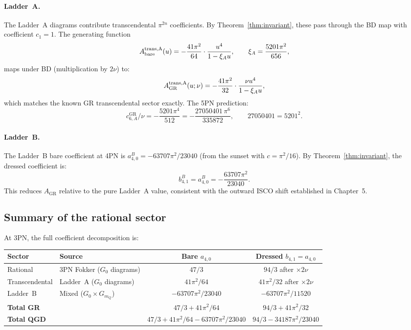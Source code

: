 \documentclass[11pt,a4paper]{article}
\theoremstyle{plain}
\theoremstyle{definition}
\theoremstyle{remark}
\newcommand{\mQ}{m_Q}
\newcommand{\GR}{\mathrm{GR}}
\newcommand{\bare}{\mathrm{bare}}
\begin{document}
\paragraph{Ladder~A.} The Ladder~A diagrams contribute transcendental
$\pi^{2n}$ coefficients.  By Theorem~\ref{thm:invariant}, these pass through
the BD map with coefficient $c_1 = 1$.  The generating function
\begin{equation}
  A_\bare^{\rm trans,A}(u) = -\frac{41\pi^2}{64}\cdot\frac{u^4}{1-\xi_A u},
  \qquad \xi_A = \frac{5201\pi^2}{656},
\end{equation}
maps under BD (multiplication by $2\nu$) to:
\begin{equation}
  A_\GR^{\rm trans,A}(u;\nu) = -\frac{41\pi^2}{32}\cdot\frac{\nu u^4}{1-\xi_A u},
  \label{eq:ladder_A_dressed}
\end{equation}
which matches the known GR transcendental sector exactly.  The 5PN prediction:
\begin{equation}
  c_{6,A}^\GR/\nu = -\frac{5201\pi^4}{512}
  = -\frac{27050401\,\pi^6}{335872},
  \qquad 27050401 = 5201^2.
\end{equation}

\paragraph{Ladder~B.} The Ladder~B bare coefficient at 4PN is
$a_{4,0}^B = -63707\pi^2/23040$ (from the sunset with $c=\pi^2/16$).  By
Theorem~\ref{thm:invariant}, the dressed coefficient is:
\begin{equation}
  b_{4,1}^B = a_{4,0}^B = -\frac{63707\pi^2}{23040}.
\end{equation}
This reduces $A_\GR$ relative to the pure Ladder~A value, consistent with the
outward ISCO shift established in Chapter~5.

\subsection{Summary of the rational sector}

At 3PN, the full coefficient decomposition is:

\begin{center}
\renewcommand{\arraystretch}{1.45}
\begin{tabular}{llcc}
\toprule
Sector & Source & Bare $a_{4,0}$ & Dressed $b_{4,1} = a_{4,0}$ \\
\midrule
Rational & 3PN Fokker ($G_0$ diagrams) & $47/3$ & $94/3$ after $\times 2\nu$ \\
Transcendental & Ladder~A ($G_0$ diagrams) & $41\pi^2/64$ & $41\pi^2/32$ after $\times 2\nu$ \\
Ladder~B & Mixed ($G_0 \times G_{\mQ}$) & $-63707\pi^2/23040$ & $-63707\pi^2/11520$ \\
\midrule
\textbf{Total GR} & & $47/3 + 41\pi^2/64$ & $94/3 + 41\pi^2/32$ \\
\textbf{Total QGD} & & $47/3+41\pi^2/64-63707\pi^2/23040$ & $94/3 - 34187\pi^2/23040$ \\
\bottomrule
\end{tabular}
\end{center}
\end{document}
